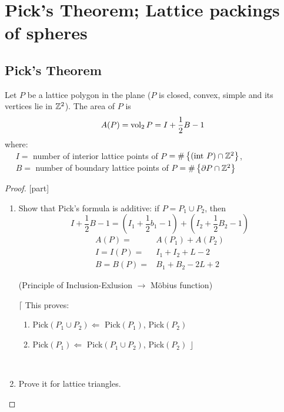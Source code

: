 \chapter{Pick's Theorem; Lattice packings of spheres}


\section{Pick's Theorem}
\begin{theorem}[Pick]
Let $P$ be a lattice polygon in the plane ($P$ is closed, convex, simple and its vertices lie in $\mathbb{Z}^{2}$).
The area of $P$ is $$A(P)=\operatorname{vol}_{2}P=I+\frac{1}{2}B-1$$where:\\
$\mbox{    }\mbox{    } I=$ number of interior lattice points of $P$ $=\#\left\{(\mbox{int }P)\cap\mathbb{Z}^{2}\right\}$,\\
$\mbox{    }\mbox{    } B=$ number of boundary lattice points of $P$ $=\#\left\{\partial{}P\cap\mathbb{Z}^{2}\right\}$
\end{theorem}
\begin{proof}\mbox{[part]}\\
\begin{enumerate}
\item Show that Pick's formula is additive: if $P=P_1\cup{}P_2$, then $$I+\frac{1}{2}B-1=\left(I_1+\frac{1}{2}b_1-1\right)+\left(I_2+\frac{1}{2}B_2-1\right)$$
\begin{align*}A(P)=&A(P_1)+A(P_2)\\
I=I(P)=&I_1+I_2+L-2\\
B=B(P)=&B_1+B_2-2L+2\end{align*}
{\center (Principle of Inclusion-Exlusion $\rightarrow$ M\"obius function)\quad\quad\\[0.3cm]

\begin{minipage}{0.6\textwidth}$\lceil$ This proves:\begin{enumerate}\item Pick$(P_1\cup{}P_2)\Leftarrow$ Pick$(P_1)$, Pick$(P_2)$\\
\item Pick$(P_1)\Leftarrow$ Pick$(P_1\cup{}P_2)$, Pick$(P_2)$ $\rfloor$\end{enumerate}\end{minipage}}\\[0.5cm]

\item Prove it for lattice triangles.\end{enumerate}
\end{proof}

